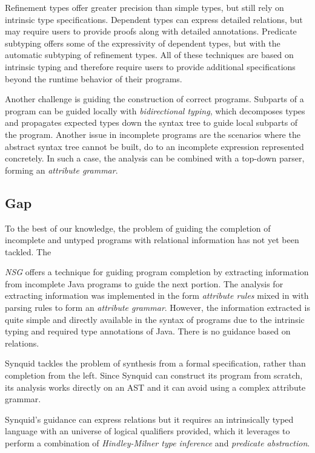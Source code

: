 \documentclass[sigplan,screen,review]{acmart}
\begin{document}
Refinement types offer greater precision than simple types, but still rely on intrinsic type specifications.
Dependent types can express detailed relations, but may require users to provide proofs along with detailed annotations.
Predicate subtyping offers some of the expressivity of dependent types, but with the automatic subtyping of refinement types.
All of these techniques are based on intrinsic typing and therefore require users to provide additional specifications 
beyond the runtime behavior of their programs.


Another challenge is guiding the construction of correct programs.
Subparts of a program can be guided locally with \textit{bidirectional typing}, which decomposes 
types and propagates expected types down the syntax tree to guide local subparts of the program. 
Another issue in incomplete programs are the scenarios where the abstract syntax tree cannot be built, 
do to an incomplete expression represented concretely. In such a case, the analysis can be combined with
a top-down parser, forming an \textit{attribute grammar}. 


\subsection{Gap}
To the best of our knowledge, the problem of guiding the completion of incomplete and untyped programs with relational information  
has not yet been tackled. The 

\textit{NSG} \cite{} offers a technique for guiding program completion by extracting information 
from incomplete Java programs to guide the next portion. The analysis for extracting
information was implemented in the form \textit{attribute rules} mixed in with parsing rules
to form an \textit{attribute grammar}. However, the information extracted is quite 
simple and directly available in the syntax of programs due to the intrinsic typing and required
type annotations of Java. There is no guidance based on relations. 

Synquid \cite{} tackles the problem of synthesis from a formal specification, rather than completion from the left. 
Since Synquid can construct its program from scratch, its analysis works directly on an AST and it can avoid
using a complex attribute grammar.

Synquid's guidance can express relations but it requires an intrinsically typed language with 
an universe of logical qualifiers provided, which it leverages to perform a combination of 
\textit{Hindley-Milner type inference} and \textit{predicate abstraction}.
 
\end{document}
